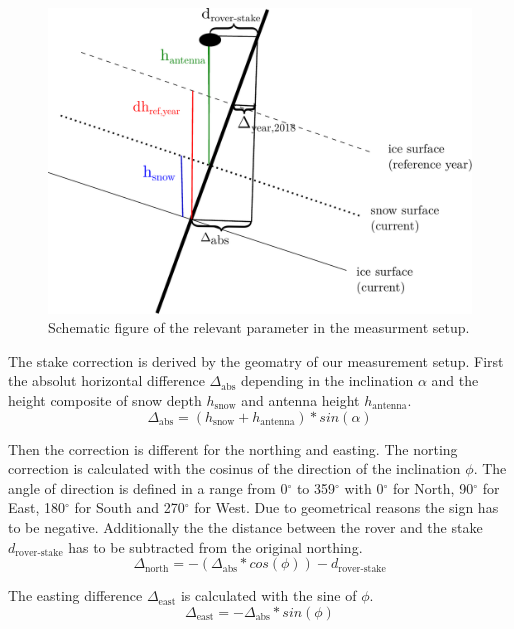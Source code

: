 \begin{figure}[H]
	\centering
	\includegraphics[width=0.9\linewidth]{./figs/pictures/schematic_setup.pdf}
	\caption{Schematic figure of the relevant parameter in the measurment setup.}
	\label{GPS:fig:schema}
\end{figure}

The stake correction is derived by the geomatry of our measurement setup.
First the absolut horizontal difference $\Delta_{\text{abs}}$ depending in the inclination $\alpha$ and the height composite of snow depth $h_{\text{snow}}$ and antenna height $h_{\text{antenna}}$.
\begin{equation}
	\Delta_{\text{abs}} = (h_{\text{snow}} + h_{\text{antenna}}) * sin(\alpha)
\end{equation}

Then the correction is different for the northing and easting. The norting correction is calculated with the cosinus of the direction of the inclination $\phi$. 
The angle of direction is defined in a range from 0$^{\circ}$ to 359$^{\circ}$ with 0$^{\circ}$ for North, 90$^{\circ}$ for East, 180$^{\circ}$ for South and 270$^{\circ}$ for West.
Due to geometrical reasons the sign has to be negative. 
Additionally the the distance between the rover and the stake $d_{\text{rover-stake}}$ has to be subtracted from the original northing.
\begin{equation}
	\Delta_{\text{north}} = - (\Delta_{\text{abs}} * cos(\phi)) - d_{\text{rover-stake}}
\end{equation}

The easting difference $\Delta_{\text{east}}$ is calculated with the sine of $\phi$.
\begin{equation}
	\Delta_{\text{east}} = - \Delta_{\text{abs}} * sin(\phi)
\end{equation}

